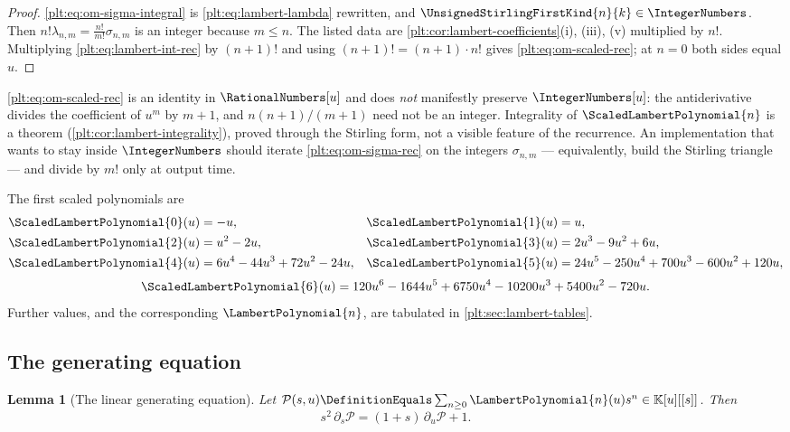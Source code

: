 \documentclass[11pt,oneside]{article}
\theoremstyle{plain}
\newtheorem{lemma}[theorem]{Lemma}
\theoremstyle{definition}
\theoremstyle{remark}
\newcommand{\K}{\mathbb{K}}
\newcommand{\stirlingone}[2]{\UnsignedStirlingFirstKind{#1}{#2}}
\newcommand{\LamP}[1]{\LambertPolynomial{#1}}
\newcommand{\LamPsc}[1]{\ScaledLambertPolynomial{#1}}
\begin{document}
\begin{proof}
\eqref{plt:eq:om-sigma-integral} is \eqref{plt:eq:lambert-lambda} rewritten,
and \(\stirlingone{n}{k}\in\IntegerNumbers\).  Then
\(n!\lambda_{n,m}=\frac{n!}{m!}\sigma_{n,m}\) is an integer because
\(m\le n\).  The listed data are \cref{plt:cor:lambert-coefficients}(i),
(iii), (v) multiplied by \(n!\).  Multiplying
\eqref{plt:eq:lambert-int-rec} by \((n+1)!\) and using
\((n+1)!=(n+1)\cdot n!\) gives \eqref{plt:eq:om-scaled-rec}; at \(n=0\) both
sides equal \(u\).
\end{proof}

\begin{warningbox}
\eqref{plt:eq:om-scaled-rec} is an identity in \(\RationalNumbers[u]\) and
does \emph{not} manifestly preserve \(\IntegerNumbers[u]\): the
antiderivative divides the coefficient of \(u^{m}\) by \(m+1\), and
\(n(n+1)/(m+1)\) need not be an integer.  Integrality of \(\LamPsc{n}\) is a
theorem (\cref{plt:cor:lambert-integrality}), proved through the Stirling
form, not a visible feature of the recurrence.  An implementation that wants
to stay inside \(\IntegerNumbers\) should iterate
\eqref{plt:eq:om-sigma-rec} on the integers \(\sigma_{n,m}\) --- equivalently,
build the Stirling triangle --- and divide by \(m!\) only at output time.
\end{warningbox}

The first scaled polynomials are
\begin{align}
 \LamPsc{0}(u)&=-u, & \LamPsc{1}(u)&=u, \notag\\
 \LamPsc{2}(u)&=u^{2}-2u, & \LamPsc{3}(u)&=2u^{3}-9u^{2}+6u, \notag\\
 \LamPsc{4}(u)&=6u^{4}-44u^{3}+72u^{2}-24u,
 & \LamPsc{5}(u)&=24u^{5}-250u^{4}+700u^{3}-600u^{2}+120u,
 \label{plt:eq:om-scaled-values}
\end{align}
\begin{equation}\label{plt:eq:om-scaled-six}
 \LamPsc{6}(u)=120u^{6}-1644u^{5}+6750u^{4}-10200u^{3}+5400u^{2}-720u .
\end{equation}
Further values, and the corresponding \(\LamP{n}\), are tabulated in
\cref{plt:sec:lambert-tables}.

\subsection{The generating equation}

\begin{lemma}[The linear generating equation]
\label{plt:lem:om-pde}
Let
\(\mathcal P(s,u)\DefinitionEquals\sum_{n\ge0}\LamP{n}(u)s^{n}\in\K[u][[s]]\).
Then
\begin{equation}\label{plt:eq:om-pde}
 s^{2}\,\partial_s\mathcal P=(1+s)\,\partial_u\mathcal P+1 .
\end{equation}
\end{lemma}
\end{document}
